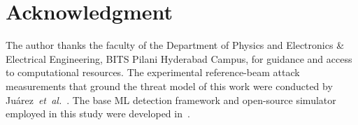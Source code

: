 \documentclass[journal,twocolumn]{IEEEtran}
\begin{document}
\section*{Acknowledgment}

The author thanks the faculty of the Department of Physics and Electronics \&
Electrical Engineering, BITS Pilani Hyderabad Campus, for guidance and access to
computational resources. The experimental reference-beam attack measurements that
ground the threat model of this work were conducted by Juárez~\emph{et~al.}~\cite{juarez2026}.
The base ML detection framework and open-source simulator employed in this study were developed
in~\cite{basepaper}.


\end{document}
